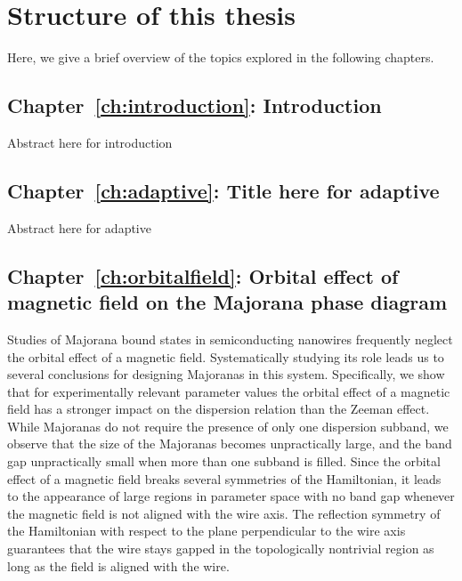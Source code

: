 \section{Structure of this thesis}

Here, we give a brief overview of the topics explored in the following chapters.
\vspace{1mm}

\subsection{Chapter~\ref{ch:introduction}: Introduction}
Abstract here for introduction
\vspace{1mm}

\subsection{Chapter~\ref{ch:adaptive}: Title here for adaptive}
Abstract here for adaptive
\vspace{1mm}

\subsection{Chapter~\ref{ch:orbitalfield}: Orbital effect of magnetic field on the Majorana phase diagram}
Studies of Majorana bound states in semiconducting nanowires frequently neglect the orbital effect of a magnetic field.
Systematically studying its role leads us to several conclusions for designing Majoranas in this system.
Specifically, we show that for experimentally relevant parameter values the orbital effect of a magnetic field has a stronger impact on the dispersion relation than the Zeeman effect.
While Majoranas do not require the presence of only one dispersion subband, we observe that the size of the Majoranas becomes unpractically large, and the band gap unpractically small when more than one subband is filled.
Since the orbital effect of a magnetic field breaks several symmetries of the Hamiltonian, it leads to the appearance of large regions in parameter space with no band gap whenever the magnetic field is not aligned with the wire axis.
The reflection symmetry of the Hamiltonian with respect to the plane perpendicular to the wire axis guarantees that the wire stays gapped in the topologically nontrivial region as long as the field is aligned with the wire.
\vspace{1mm}

